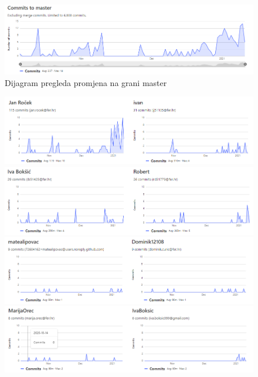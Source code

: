 		
			
		
		\begin{figure}[H]
			\begin{center}
				\includegraphics[width=15cm]{slike/master.png}
			\end{center}
			\caption{Dijagram pregleda promjena na grani master}
			\label{fig:master}
		\end{figure}
		
		\begin{figure}[H]
			\begin{center}
				\includegraphics[width=15cm]{slike/master1.PNG}
				\includegraphics[width=15cm]{slike/master2.PNG}
				\includegraphics[width=15cm]{slike/master3.PNG}
				\includegraphics[width=15cm]{slike/master4.PNG}
			\end{center}
			\label{fig:dijapre}
		\end{figure}
	
	